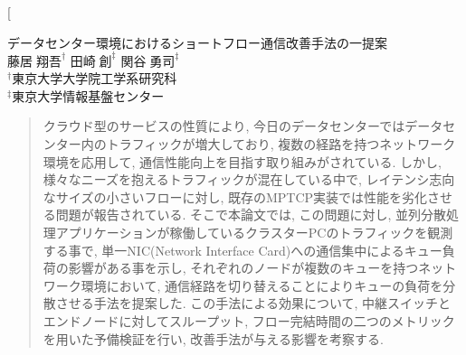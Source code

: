 \documentclass[11pt, a4paper, twocolumn]{jsarticle}
\begin{document}

\twocolumn[
\vspace{1.5cm}
\begin{center}
{\Large データセンター環境におけるショートフロー通信改善手法の一提案}\\
\vspace{1em}
{\large $藤居\;翔吾^{\dagger}$ \hspace{1.0cm}$田崎\;創^{\ddagger}$ \hspace{1.0cm}
$関谷\;勇司^{\ddagger}$}\\
${}^{\dagger}$東京大学大学院工学系研究科\\
${}^{\ddagger}$東京大学情報基盤センター \\
\end{center}
\begin{quotation}
\begin{spacing}{0.6}
{\footnotesize クラウド型のサービスの性質により, 今日のデータセンターではデータセンター内のトラフィックが増大しており,
複数の経路を持つネットワーク環境を応用して, 通信性能向上を目指す取り組みがされている.
しかし, 様々なニーズを抱えるトラフィックが混在している中で, レイテンシ志向なサイズの小さいフローに対し,
既存のMPTCP実装では性能を劣化させる問題が報告されている.
そこで本論文では, この問題に対し, 並列分散処理アプリケーションが稼働しているクラスターPCのトラフィックを観測する事で, 単一NIC(Network
Interface Card)への通信集中によるキュー負荷の影響がある事を示し,
それぞれのノードが複数のキューを持つネットワーク環境において,
通信経路を切り替えることによりキューの負荷を分散させる手法を提案した.
この手法による効果について, 中継スイッチとエンドノードに対してスループット, フロー完結時間の二つのメトリックを用いた予備検証を行い,
改善手法が与える影響を考察する.
}
\end{spacing}
\end{quotation}
\end{document}
